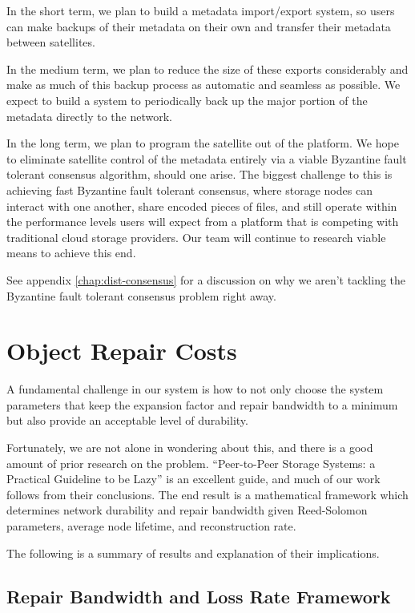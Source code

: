 \documentclass[11pt,fleqn,openany]{book}
\begin{document}
In the short term, we plan to build a metadata import/export system, so users
can make backups of their metadata on their own and transfer their metadata
between satellites.

In the medium term, we plan to reduce the size of these exports considerably
and make as much of this backup process as automatic and seamless as possible.
We expect to build a system to periodically back up the major portion of the metadata
directly to the network.

In the long term, we plan to program the satellite out of the platform.
We hope to eliminate satellite control of the metadata
entirely via a viable Byzantine fault tolerant consensus algorithm, should
one arise.
The biggest challenge to this is achieving fast Byzantine fault tolerant
consensus, where storage nodes can interact with one another, share encoded
pieces of files, and still operate within the performance levels users will
expect from a platform that is competing with traditional cloud storage
providers. Our team will continue to research viable means to achieve this end.

See appendix \ref{chap:dist-consensus} for a discussion on why
we aren't tackling the Byzantine fault tolerant consensus problem right away.

\newpage \appendix

\chapter{Object Repair Costs}

A fundamental challenge in our system is how to not only choose the system
parameters that keep the expansion factor and repair bandwidth to a minimum but
also provide an acceptable level of durability.

Fortunately, we are not alone in wondering about this, and there is a good
amount of prior research on the problem.
``Peer-to-Peer Storage Systems: a Practical Guideline to be Lazy'' \cite{p2p-lazy} is an excellent guide, and much of our work follows from their conclusions.
The end result is a mathematical framework which determines network durability
and repair bandwidth given Reed-Solomon parameters, average node lifetime, and
reconstruction rate.

The following is a summary of results and explanation of their implications.

\section{Repair Bandwidth and Loss Rate Framework}
\end{document}
